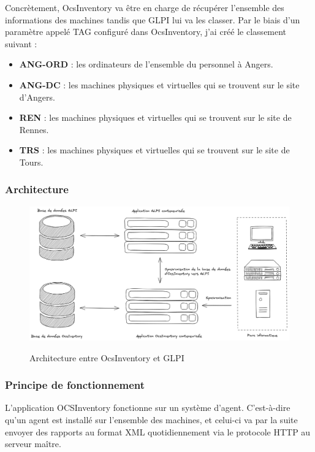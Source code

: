 \documentclass[12pt]{article}
\begin{document}
Concrètement, OcsInventory va être en charge de récupérer l'ensemble des informations des machines tandis que GLPI lui va les classer. 
Par le biais d'un paramètre appelé TAG configuré dans OcsInventory, j'ai créé le classement suivant :
\begin{itemize}
    \item \textbf{ANG-ORD} : les ordinateurs de l'ensemble du personnel à Angers.
    \item \textbf{ANG-DC} : les machines physiques et virtuelles qui se trouvent sur le site d'Angers.
    \item \textbf{REN} : les machines physiques et virtuelles qui se trouvent sur le site de Rennes.
    \item \textbf{TRS} : les machines physiques et virtuelles qui se trouvent sur le site de Tours.
\end{itemize}

\subsubsection{Architecture}
\begin{figure}[!ht]
    \centering
    \includegraphics[width=\textwidth]{src/Fonctionne GLPI.png}
    \label{fig:glpi}
    \caption{Architecture entre OcsInventory et GLPI}
\end{figure}

\newpage
\subsubsection{Principe de fonctionnement}
L'application OCSInventory fonctionne sur un système d'agent.
C'est-à-dire qu'un agent est installé sur l'ensemble des machines, et celui-ci va par la suite envoyer des rapports au format XML quotidiennement via le protocole HTTP au serveur maître. 
\end{document}
